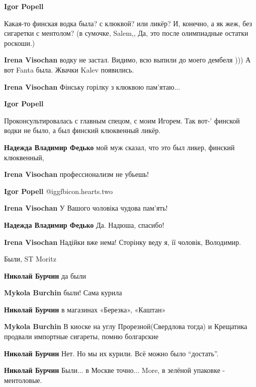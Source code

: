 \begin{itemize}
\begin{itemize}
\begin{itemize} %
\textbf{Igor Popell} 

Какая-то финская водка была? с клюквой? или ликёр? И, конечно, а як жеж, без
сигаретки с ментолом? (в сумочке, Salem,, Да, это после олимпиадные остатки
роскоши.)


\textbf{Irena Visochan} водку не застал. Видимо, всю выпили до моего дембеля ))) А вот Fanta была. Жвачки Kalev появились.

\textbf{Irena Visochan} Фінську горілку з клюквою пам'ятаю...

\textbf{Igor Popell} 

Проконсультировалась с главным спецом, с моим Игорем. Так вот-' финской водки
не было, а был финский клюквенный ликёр.


\textbf{Надежда Владимир Федько} мой муж сказал, что это был ликер, финский клюквенный,

\textbf{Irena Visochan} профессионализм не убьешь!

\textbf{Igor Popell}  @igg{fbicon.hearts.two} 

\textbf{Irena Visochan} У Вашого чоловіка чудова пам'ять!

\textbf{Надежда Владимир Федько} Да. Надюша, спасибо!

\textbf{Irena Visochan} Надійки вже нема! Сторінку веду я, її чоловік, Володимир.
\end{itemize} %

Были, ST Moritz

\textbf{Николай Бурчин} да были

\textbf{Mykola Burchin} были! Сама курила

\textbf{Николай Бурчин} в магазинах «Березка», «Каштан»

\textbf{Mykola Burchin} В киоске на углу Прорезной(Свердлова тогда) и Крещатика продвали импортные сигареты, помню болгарские

\textbf{Николай Бурчин} Нет. Но мы их курили. Всё можно было \enquote{достать}.

\textbf{Николай Бурчин}
Были... в Москве точно... More, в зелёной упаковке - ментоловые.


\end{itemize}
\end{itemize}
